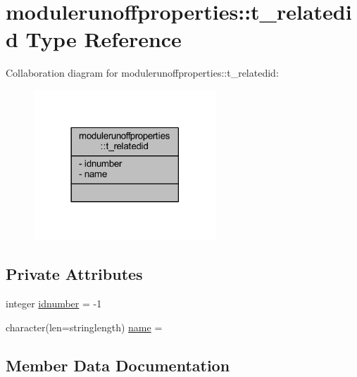 \hypertarget{structmodulerunoffproperties_1_1t__relatedid}{}\section{modulerunoffproperties\+:\+:t\+\_\+relatedid Type Reference}
\label{structmodulerunoffproperties_1_1t__relatedid}


Collaboration diagram for modulerunoffproperties\+:\+:t\+\_\+relatedid\+:\nopagebreak
\begin{figure}[H]
\begin{center}
\leavevmode
\includegraphics[width=194pt]{structmodulerunoffproperties_1_1t__relatedid__coll__graph}
\end{center}
\end{figure}
\subsection*{Private Attributes}
\begin{DoxyCompactItemize}
\item 
integer \mbox{\hyperlink{structmodulerunoffproperties_1_1t__relatedid_ab51f04a9d38b73b37298f2b7ab0e1953}{idnumber}} = -\/1
\item 
character(len=stringlength) \mbox{\hyperlink{structmodulerunoffproperties_1_1t__relatedid_a16dc0becd33a4d868d3f6d97994e365a}{name}} = \textquotesingle{}\textquotesingle{}
\end{DoxyCompactItemize}


\subsection{Member Data Documentation}
\mbox{\label{structmodulerunoffproperties_1_1t__relatedid_ab51f04a9d38b73b37298f2b7ab0e1953}} 
